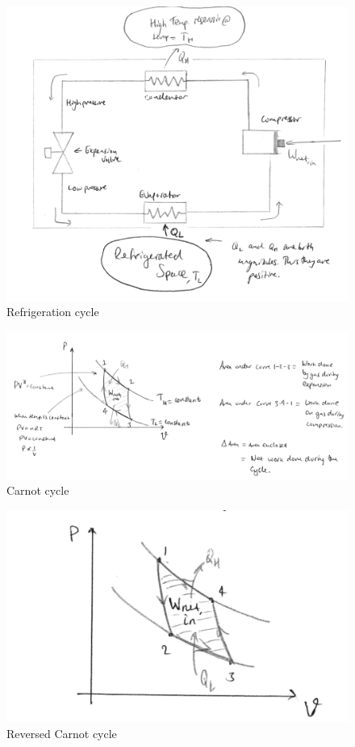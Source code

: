 \documentclass[class=report, crop=false, 12pt,a4paper]{standalone}
\begin{document}
\begin{figure}[H]
  \begin{center}
    \includegraphics[width = \textwidth]{../img/RefrigerationCycle}
    \caption{Refrigeration cycle}
  \end{center}
\end{figure}
\begin{figure}[H]
  \begin{center}
    \includegraphics[width = \textwidth]{../img/CarnotCycle}
    \caption{Carnot cycle}
  \end{center}
\end{figure}
\begin{figure}[H]
  \begin{center}
    \includegraphics[width = \textwidth]{../img/ReversedCarnotCycle}
    \caption{Reversed Carnot cycle}
  \end{center}
\end{figure}
\end{document}
